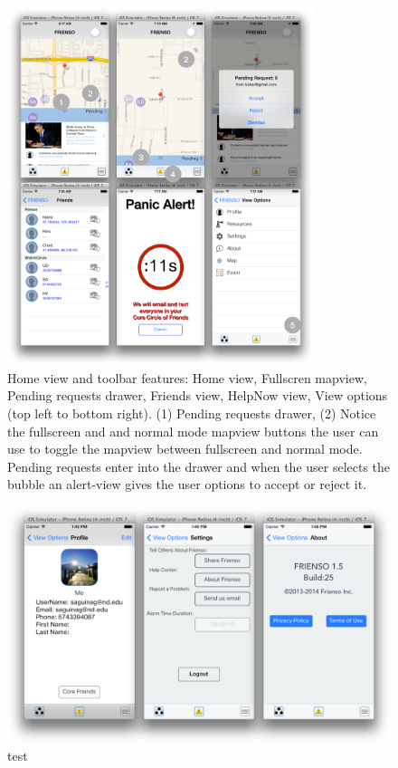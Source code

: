 \begin{figure}[ht]
 \centering
   \includegraphics[width=0.8\textwidth]{images/mvp_actual1.png}
    \caption{
	Home view and toolbar features: Home view, Fullscren mapview, Pending requests drawer, 
	Friends view, HelpNow view, View options (top left to bottom right). (1) Pending
	requests drawer, (2) Notice the fullscreen and and normal mode mapview buttons the user can
	use to toggle the mapview between fullscreen and normal mode.  Pending requests
	enter into the drawer and when the user selects the bubble an alert-view gives the 
	user options to accept or reject it.
	}
	\end{figure}
\begin{figure}[ht!]
 \centering
   \includegraphics[width=\textwidth]{images/mvp_actual2.png}
    \caption{
	test
	}
	\end{figure}
\clearpage
	
